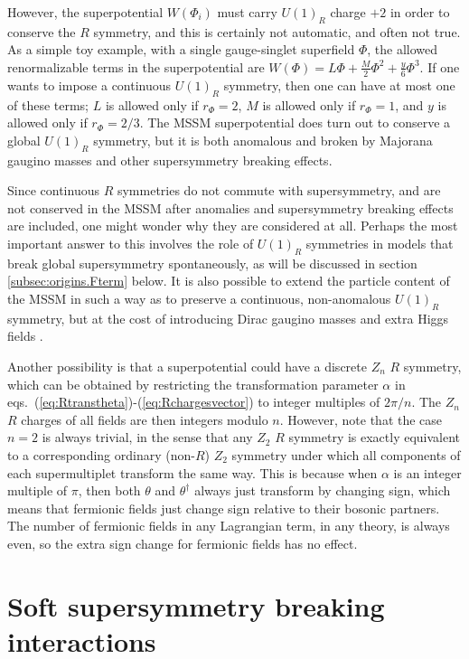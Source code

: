 \documentclass[11pt]{article}
\renewcommand{\theequation}{\arabic{section}.\arabic{equation}}
\begin{document}
However, the superpotential $W(\Phi_i)$ must carry 
$U(1)_R$ charge $+2$ in order to conserve the $R$ symmetry, 
and this is certainly not 
automatic, and often not true. As a simple toy example, 
with a single gauge-singlet superfield $\Phi$, the allowed renormalizable 
terms in the superpotential are $W(\Phi) = L \Phi + \frac{M}{2} \Phi^2 + 
\frac{y}{6} \Phi^3$. If one wants to impose a continuous $U(1)_R$ symmetry, 
then one can have at most one of these terms; $L$ is allowed only if 
$r_\Phi = 2$, $M$ is allowed only if $r_\Phi = 1$, and $y$ is allowed 
only if $r_\Phi = 2/3$. The MSSM superpotential 
does turn out to conserve a global $U(1)_R$ symmetry, but it is both anomalous
and broken by Majorana gaugino masses and other supersymmetry breaking effects.

Since continuous $R$ symmetries do not commute 
with supersymmetry, and are not conserved in the MSSM after anomalies 
and supersymmetry breaking effects are
included, one might wonder why they are considered at all. 
Perhaps the most important answer to this involves the role of $U(1)_R$ 
symmetries in models that break global supersymmetry spontaneously, as 
will be discussed in section \ref{subsec:origins.Fterm} below. 
It is also possible to extend the particle content of the MSSM in such a way as to 
preserve a continuous, non-anomalous $U(1)_R$ symmetry, 
but at the cost of introducing Dirac gaugino masses and extra Higgs 
fields \cite{Kribs:2007ac}.

Another possibility is that a superpotential could 
have a discrete $Z_n$ $R$ symmetry, which can be 
obtained by restricting the transformation parameter $\alpha$ in 
eqs.~(\ref{eq:Rtranstheta})-(\ref{eq:Rchargesvector}) to integer 
multiples of $2\pi/n$. The $Z_n$ $R$ charges of all fields are then 
integers modulo $n$. However, note that the case $n=2$ is always trivial, in the 
sense that any $Z_2$ $R$ symmetry is exactly equivalent to a 
corresponding ordinary (non-$R$) $Z_2$ symmetry under which all components of 
each supermultiplet transform the same way. This is because when $\alpha$ 
is an integer multiple of $\pi$, then both $\theta$ and $\theta^\dagger$ 
always just transform by changing sign, which means that fermionic fields just  
change sign relative to their bosonic partners. The number of fermionic fields 
in any Lagrangian term, in any theory, is always even, so the extra sign 
change for fermionic fields has no effect.

\section{Soft supersymmetry breaking interactions}\label{sec:soft}
\renewcommand{\theequation}{\arabic{section}.\arabic{equation}}
\setcounter{equation}{0}
\setcounter{figure}{0}
\setcounter{table}{0}
\setcounter{footnote}{1}
\end{document}
